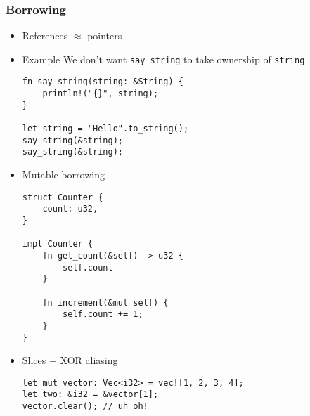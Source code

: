 \documentclass[11pt]{article}
\begin{document}
\subsubsection*{Borrowing}
\label{sec:org4beca48}
\begin{itemize}
\item References
\label{sec:org65e70be}
\(\approx\) pointers

\item Example
\label{sec:org980b986}
We don't want \texttt{say\_string} to take ownership of \texttt{string}
\begin{verbatim}
fn say_string(string: &String) {
    println!("{}", string);
}

let string = "Hello".to_string();
say_string(&string);
say_string(&string);
\end{verbatim}

\item Mutable borrowing
\label{sec:org48fc288}
\begin{verbatim}
struct Counter {
    count: u32,
}

impl Counter {
    fn get_count(&self) -> u32 {
        self.count
    }

    fn increment(&mut self) {
        self.count += 1;
    }
}
\end{verbatim}

\item Slices + XOR aliasing
\label{sec:org9d6d242}
\begin{verbatim}
let mut vector: Vec<i32> = vec![1, 2, 3, 4];
let two: &i32 = &vector[1];
vector.clear(); // uh oh!
\end{verbatim}
\end{itemize}
\end{document}
